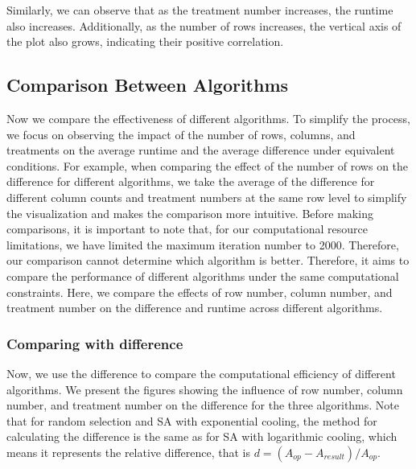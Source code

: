 \documentclass[
  a4paper,
  oneside,
  openany,
  12pt,
  onecolumn]{book}
\theoremstyle{definition}
\theoremstyle{plain}
\theoremstyle{remark}
\begin{document}
Similarly, we can observe that as the treatment number increases, the
runtime also increases. Additionally, as the number of rows increases,
the vertical axis of the plot also grows, indicating their positive
correlation.

\subsection{Comparison Between
Algorithms}\label{comparison-between-algorithms}

Now we compare the effectiveness of different algorithms. To simplify
the process, we focus on observing the impact of the number of rows,
columns, and treatments on the average runtime and the average
difference under equivalent conditions. For example, when comparing the
effect of the number of rows on the difference for different algorithms,
we take the average of the difference for different column counts and
treatment numbers at the same row level to simplify the visualization
and makes the comparison more intuitive. Before making comparisons, it
is important to note that, for our computational resource limitations,
we have limited the maximum iteration number to 2000. Therefore, our
comparison cannot determine which algorithm is better. Therefore, it
aims to compare the performance of different algorithms under the same
computational constraints. Here, we compare the effects of row number,
column number, and treatment number on the difference and runtime across
different algorithms.

\subsubsection{Comparing with
difference}\label{comparing-with-difference}

Now, we use the difference to compare the computational efficiency of
different algorithms. We present the figures showing the influence of
row number, column number, and treatment number on the difference for
the three algorithms. Note that for random selection and SA with
exponential cooling, the method for calculating the difference is the
same as for SA with logarithmic cooling, which means it represents the
relative difference, that is \(d = (A_{op}-A_{result})/A_{op}\).
\end{document}
